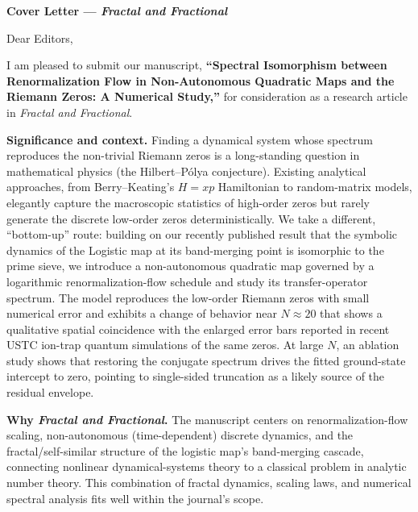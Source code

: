 \documentclass[11pt]{article}
\begin{document}
\noindent\textbf{\large Cover Letter --- \textit{Fractal and Fractional}}

\vspace{0.1em}

\noindent Dear Editors,

\vspace{0.15em}

\noindent I am pleased to submit our manuscript, \textbf{``Spectral Isomorphism between Renormalization Flow in Non-Autonomous Quadratic Maps and the Riemann Zeros: A Numerical Study,''} for consideration as a research article in \textit{Fractal and Fractional}.

\vspace{0.1em}

\noindent\textbf{Significance and context.} Finding a dynamical system whose spectrum reproduces the non-trivial Riemann zeros is a long-standing question in mathematical physics (the Hilbert--P\'olya conjecture). Existing analytical approaches, from Berry--Keating's $H=xp$ Hamiltonian to random-matrix models, elegantly capture the macroscopic statistics of high-order zeros but rarely generate the discrete low-order zeros deterministically. We take a different, ``bottom-up'' route: building on our recently published result that the symbolic dynamics of the Logistic map at its band-merging point is isomorphic to the prime sieve, we introduce a non-autonomous quadratic map governed by a logarithmic renormalization-flow schedule and study its transfer-operator spectrum. The model reproduces the low-order Riemann zeros with small numerical error and exhibits a change of behavior near $N\approx20$ that shows a qualitative spatial coincidence with the enlarged error bars reported in recent USTC ion-trap quantum simulations of the same zeros. At large $N$, an ablation study shows that restoring the conjugate spectrum drives the fitted ground-state intercept to zero, pointing to single-sided truncation as a likely source of the residual envelope.

\vspace{0.1em}

\noindent\textbf{Why \textit{Fractal and Fractional}.} The manuscript centers on renormalization-flow scaling, non-autonomous (time-dependent) discrete dynamics, and the fractal/self-similar structure of the logistic map's band-merging cascade, connecting nonlinear dynamical-systems theory to a classical problem in analytic number theory. This combination of fractal dynamics, scaling laws, and numerical spectral analysis fits well within the journal's scope.
\end{document}
